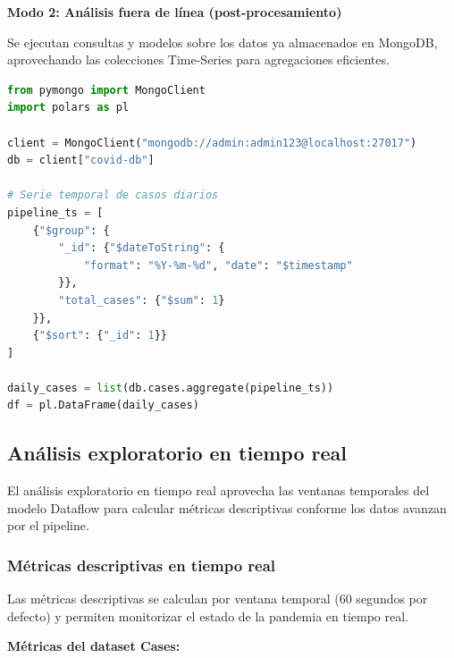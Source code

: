 \documentclass[12pt,a4paper]{article}
\begin{document}
\textbf{Modo 2: Análisis fuera de línea (post-procesamiento)}

Se ejecutan consultas y modelos sobre los datos ya almacenados en MongoDB, aprovechando las colecciones Time-Series para agregaciones eficientes.

\begin{lstlisting}[language=Python, caption=Análisis post-procesamiento sobre MongoDB]
from pymongo import MongoClient
import polars as pl

client = MongoClient("mongodb://admin:admin123@localhost:27017")
db = client["covid-db"]

# Serie temporal de casos diarios
pipeline_ts = [
    {"$group": {
        "_id": {"$dateToString": {
            "format": "%Y-%m-%d", "date": "$timestamp"
        }},
        "total_cases": {"$sum": 1}
    }},
    {"$sort": {"_id": 1}}
]

daily_cases = list(db.cases.aggregate(pipeline_ts))
df = pl.DataFrame(daily_cases)
\end{lstlisting}

\subsection{Análisis exploratorio en tiempo real}\label{anuxe1lisis-exploratorio-en-tiempo-real}

El análisis exploratorio en tiempo real aprovecha las ventanas temporales del modelo Dataflow para calcular métricas descriptivas conforme los datos avanzan por el pipeline.

\subsubsection{Métricas descriptivas en tiempo real}

Las métricas descriptivas se calculan por ventana temporal (60 segundos por defecto) y permiten monitorizar el estado de la pandemia en tiempo real.

\textbf{Métricas del dataset Cases:}
\end{document}
